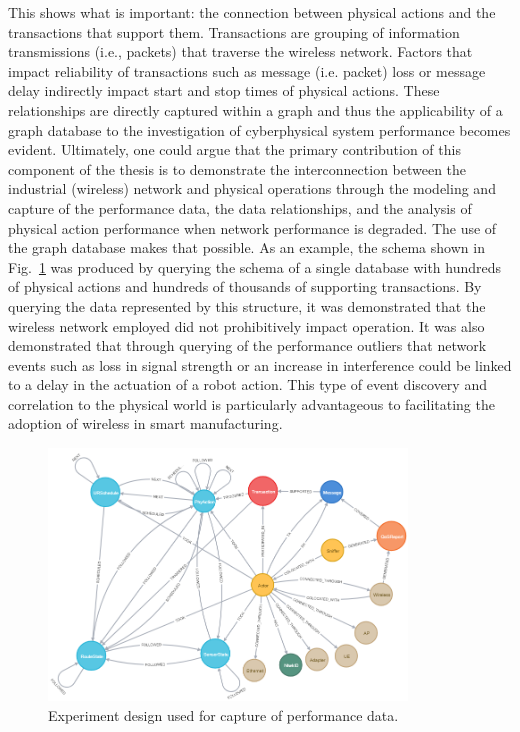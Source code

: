 This shows what is important: the connection between physical actions and the transactions that support them.  Transactions are grouping of information transmissions (i.e., packets) that traverse the wireless network.  Factors that impact reliability of transactions such as message (i.e. packet) loss or message delay indirectly impact start and stop times of physical actions.  These relationships are directly captured within a graph and thus the applicability of a graph database to the investigation of cyberphysical system performance becomes evident.  Ultimately, one could argue that the primary contribution of this component of the thesis is to demonstrate the interconnection between the industrial (wireless) network and physical operations through the modeling and capture of the performance data, the data relationships, and the analysis of physical action performance when network performance is degraded.  The use of the graph database makes that possible.  As an example, the schema shown in Fig.~\ref{fig:concl:data-physical-actions-following} was produced by querying the schema of a single database with hundreds of physical actions and hundreds of thousands of supporting transactions.  By querying the data represented by this structure, it was demonstrated that the wireless network employed did not prohibitively impact operation.  It was also demonstrated that through querying of the performance outliers that network events such as loss in signal strength or an increase in interference could be linked to a delay in the actuation of a robot action.  This type of event discovery and correlation to the physical world is particularly advantageous to facilitating the adoption of wireless in smart manufacturing.

\begin{figure}[!ht]
	\centering
	\includegraphics[width=0.85\textwidth]{chapter-gdb-appl/figures/database/graph_schema_updated_2.png}
	\caption{Experiment design used for capture of performance data.}
	\label{fig:concl:data-physical-actions-following}
\end{figure}

